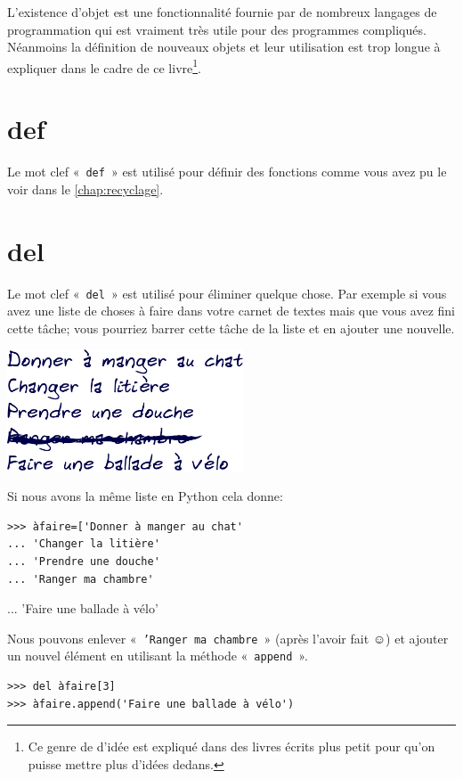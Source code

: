 L'existence d'objet est une fonctionnalité fournie par de nombreux langages de programmation qui est vraiment très utile pour des programmes compliqués. Néanmoins la définition de nouveaux objets et leur utilisation est trop longue à expliquer dans le cadre de ce livre\footnote{Ce genre de d'idée est expliqué dans des livres écrits plus petit pour qu'on puisse mettre plus d'idées dedans.}.

\section*{def}
Le mot clef «~\texttt{def}~» est utilisé pour définir des fonctions comme vous avez pu le voir dans le \autoref{chap:recyclage}.

\section*{del}
Le mot clef «~\texttt{del}~» est utilisé pour éliminer quelque chose. Par exemple si vous avez une liste de choses à faire dans votre carnet de textes mais que vous avez fini cette tâche; vous pourriez barrer cette tâche de la liste et en ajouter une nouvelle.

\begin{center}
\includegraphics*[width=70mm]{images/liste2}
\end{center}

Si nous avons la même liste en Python cela donne:
\begin{Verbatim}[frame=single,rulecolor=\color{gray}]
>>> àfaire=['Donner à manger au chat'
... 'Changer la litière'
... 'Prendre une douche'
... 'Ranger ma chambre'
\end{Verbatim}

... 'Faire une ballade à vélo'

Nous pouvons enlever «~\texttt{'Ranger ma chambre}~» (après l'avoir fait ☺) 
et ajouter un nouvel élément en utilisant la méthode «~\texttt{append}~».

\begin{Verbatim}[frame=single,rulecolor=\color{gray}]
>>> del àfaire[3]
>>> àfaire.append('Faire une ballade à vélo')
\end{Verbatim}

